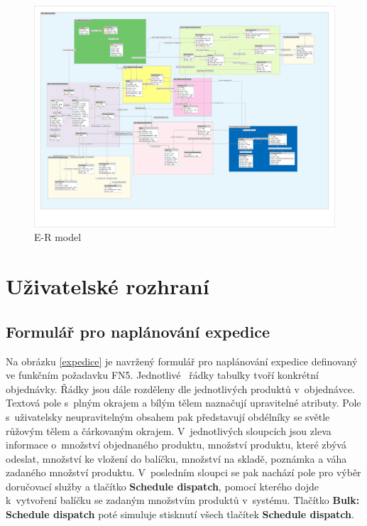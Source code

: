\documentclass[thesis=B,czech]{FITthesis}[2012/06/26]
\begin{document}
\begin{figure}
	\includegraphics[width=500pt, height=\textwidth, angle=270]{mahasys_ermodel.png}
	\caption{E-R model}\label{er_model}
\end{figure}



\section{Uživatelské rozhraní}

\subsection{Formulář pro naplánování expedice}
	Na obrázku \ref{expedice} je navržený formulář pro naplánování expedice definovaný ve funkčním požadavku FN5. Jednotlivé ~řádky tabulky tvoří konkrétní objednávky. Řádky jsou dále rozděleny dle jednotlivých produktů v~objednávce. Textová pole s~plným okrajem a bílým tělem naznačují upravitelné atributy. Pole s~uživatelsky neupravitelným obsahem pak představují obdélníky se světle růžovým tělem a čárkovaným okrajem. V~jednotlivých sloupcích jsou zleva informace o~množství objednaného produktu, množství produktu, které zbývá odeslat, množství ke vložení do balíčku, množství na skladě, poznámka a váha zadaného množství produktu. V~posledním sloupci se pak nachází pole pro výběr doručovací služby a tlačítko \textbf{Schedule dispatch}, pomocí kterého dojde k~vytvoření balíčku se zadaným množstvím produktů v~systému. Tlačítko \textbf{Bulk: Schedule dispatch} poté simuluje stisknutí všech tlačítek \textbf{Schedule dispatch}.
\end{document}
